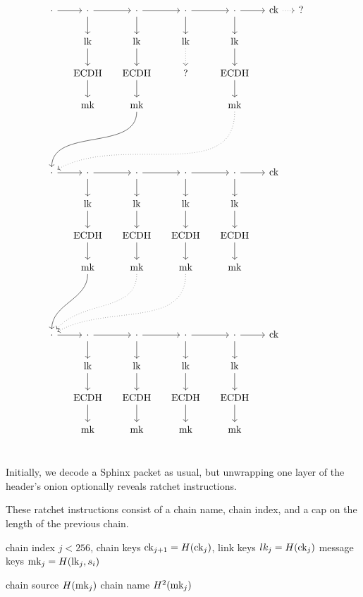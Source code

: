 \documentclass[twoside,letterpaper]{sig-alternate}
\begin{document}
\[\begin{tikzcd}[ampersand replacement=\&, column sep=small]
\cdot \ar[r] \& \cdot \ar[r] \ar[d] \& \cdot \ar[r] \ar[d] \& \cdot \ar[r] \ar[d] \& \cdot \ar[r] \ar[d] \& \ck \ar[r, dotted] \& ? \& \\
 \& \lk \ar[d] \& \lk \ar[d] \& \lk \ar[d, dotted] \& \lk \ar[d] \&  \& \& \\ 
 \& \ECDH \ar[d] \& \ECDH \ar[d] \& ? \& \ECDH\ar[d] \&  \& \& \\
 \& \mk \& \mk \ar[dddll, in=90, out=270] \&  \& \mk \ar[dddllll, dotted, in=30, out=270] \&  \& \& \\
\\
\\
\cdot \ar[r] \& \cdot \ar[r] \ar[d] \& \cdot \ar[r] \ar[d] \& \cdot \ar[r] \ar[d] \& \cdot \ar[r] \ar[d] \& \ck \& \& \\
 \& \lk \ar[d] \& \lk \ar[d] \& \lk \ar[d] \& \lk \ar[d] \&  \& \& \\ 
 \& \ECDH \ar[d] \& \ECDH \ar[d] \& \ECDH \ar[d] \& \ECDH\ar[d] \&  \& \& \\
 \& \mk \ar[dddl, in=90, out=270] \& \mk \ar[dddll, dotted, in=50, out=270] \& \mk \ar[dddlll, dotted, in=30, out=270] \& \mk \&  \& \& \\
\\
\\
\cdot \ar[r] \& \cdot \ar[r] \ar[d] \& \cdot \ar[r] \ar[d] \& \cdot \ar[r] \ar[d] \& \cdot \ar[r] \ar[d] \& \ck \& \& \\
 \& \lk \ar[d] \& \lk \ar[d] \& \lk \ar[d] \& \lk \ar[d] \&  \& \& \\ 
 \& \ECDH \ar[d] \& \ECDH \ar[d] \& \ECDH \ar[d] \& \ECDH\ar[d] \&  \& \& \\
 \& \mk \& \mk \& \mk \& \mk \&  \& \& \\
\end{tikzcd}\]

Initially, we decode a Sphinx packet as usual, but unwrapping one
layer of the header's onion optionally reveals ratchet instructions. 

These ratchet instructions consist of a chain name, chain index, and
a cap on the length of the previous chain. 

 chain index $j < 256$,
 chain keys $\textrm{ck}_{j+1} = H(\textrm{ck}_j)$,
 link keys $lk_j = H(\textrm{ck}_j)$
 message keys $\textrm{mk}_j = H(\textrm{lk}_j,s_i)$ 


 chain source $H(\textrm{mk}_j)$
 chain name $H^2(\textrm{mk}_j)$








\end{document}
